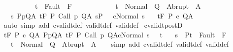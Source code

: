 \begin{isabellebody}
\ \ \ \ \ \ \ \ \ \ t\ {\isasymnotin}\ Fault\ {\isacharbackquote}\ F{\isasymrbrakk}\ \isanewline
\ \ \ \ \ \ \ \ \ \ {\isasymLongrightarrow}\ t\ {\isasymin}\ Normal\ {\isacharbackquote}\ Q\ {\isasymunion}\ Abrupt\ {\isacharbackquote}\ A{\isacharsemicolon}\isanewline
\ \ \ {\isasymAnd}s{\isachardot}\ {\isasymlbrakk}{\isasymforall}{\isacharparenleft}P{\isacharcomma}p{\isacharcomma}Q{\isacharcomma}A{\isacharparenright}{\isasymin}{\isasymTheta}{\isachardot}\ {\isasymGamma}{\isasymTurnstile}\isactrlsub t\isactrlbsub {\isacharslash}F\isactrlesub \ P\ {\isacharparenleft}Call\ p{\isacharparenright}\ Q{\isacharcomma}A{\isacharsemicolon}\ s{\isasymin}P{\isasymrbrakk}\ {\isasymLongrightarrow}\ \ {\isasymGamma}{\isasymturnstile}c{\isasymdown}{\isacharparenleft}Normal\ s{\isacharparenright}{\isasymrbrakk}\isanewline
\ \ {\isasymLongrightarrow}\ {\isasymGamma}{\isacharcomma}{\isasymTheta}{\isasymTurnstile}\isactrlsub t\isactrlbsub {\isacharslash}F\isactrlesub \ P\ c\ Q{\isacharcomma}A{\isachardoublequoteclose}\isanewline
%
\isadelimproof
\ \ %
\endisadelimproof
%
\isatagproof
{}\isamarkupfalse%
\ {\isacharparenleft}auto\ simp\ add{\isacharcolon}\ cvalidt{\isacharunderscore}def\ validt{\isacharunderscore}def\ valid{\isacharunderscore}def{\isacharparenright}%
\endisatagproof
{\isafoldproof}%
%
\isadelimproof
\isanewline
%
\endisadelimproof
\isanewline
{}\isamarkupfalse%
\ cvalidt{\isacharunderscore}postD{\isacharcolon}\ \isanewline
\ {\isachardoublequoteopen}{\isasymlbrakk}{\isasymGamma}{\isacharcomma}{\isasymTheta}{\isasymTurnstile}\isactrlsub t\isactrlbsub {\isacharslash}F\isactrlesub \ P\ c\ Q{\isacharcomma}A{\isacharsemicolon}\ {\isasymforall}{\isacharparenleft}P{\isacharcomma}p{\isacharcomma}Q{\isacharcomma}A{\isacharparenright}{\isasymin}{\isasymTheta}{\isachardot}\ {\isasymGamma}{\isasymTurnstile}\isactrlsub t\isactrlbsub {\isacharslash}F\isactrlesub \ P\ {\isacharparenleft}Call\ p{\isacharparenright}\ Q{\isacharcomma}A{\isacharsemicolon}{\isasymGamma}{\isasymturnstile}{\isasymlangle}c{\isacharcomma}Normal\ s\ {\isasymrangle}\ {\isasymRightarrow}\ t{\isacharsemicolon}\isanewline
\ \ \ s\ {\isasymin}\ P{\isacharsemicolon}t\ {\isasymnotin}\ Fault\ {\isacharbackquote}\ F{\isasymrbrakk}\ \isanewline
\ \ {\isasymLongrightarrow}\ t\ {\isasymin}\ Normal\ {\isacharbackquote}\ Q\ {\isasymunion}\ Abrupt\ {\isacharbackquote}\ A{\isachardoublequoteclose}\isanewline
%
\isadelimproof
\ \ %
\endisadelimproof
%
\isatagproof
{}\isamarkupfalse%
\ {\isacharparenleft}simp\ add{\isacharcolon}\ cvalidt{\isacharunderscore}def\ validt{\isacharunderscore}def\ valid{\isacharunderscore}def{\isacharparenright}%

\end{isabellebody}
